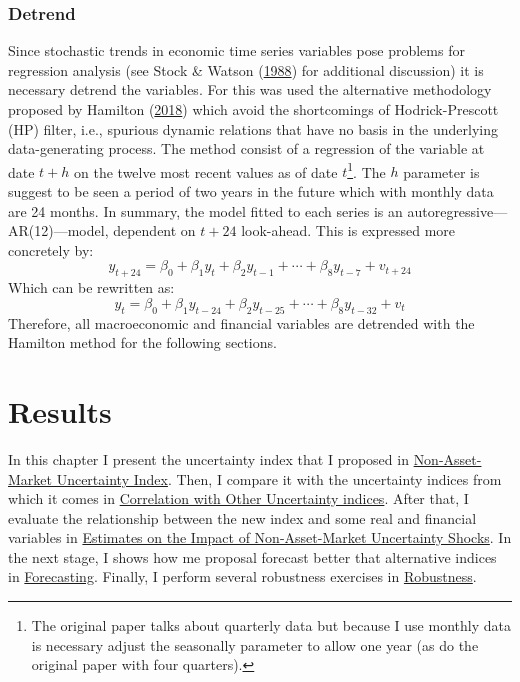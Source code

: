 \documentclass[12pt,twoside]{reedthesis}
\begin{document}
\hypertarget{detrend}{%
\subsection{Detrend}\label{detrend}}

Since stochastic trends in economic time series variables pose problems for regression analysis (see Stock \& Watson (\protect\hyperlink{ref-stocwats:1988}{1988}) for additional discussion) it is necessary detrend the variables. For this was used the alternative methodology proposed by Hamilton (\protect\hyperlink{ref-hamilton:2018}{2018}) which avoid the shortcomings of Hodrick-Prescott (HP) filter, i.e., spurious dynamic relations that have no basis in the underlying data-generating process. The method consist of a regression of the variable at date \(t + h\) on the twelve most recent values as of date \(t\)\footnote{The original paper talks about quarterly data but because I use monthly data is necessary adjust the seasonally parameter to allow one year (as do the original paper with four quarters).}. The \(h\) parameter is suggest to be seen a period of two years in the future which with monthly data are 24 months. In summary, the model fitted to each series is an autoregressive---AR(12)---model, dependent on \(t + 24\) look-ahead. This is expressed more concretely by:
\begin{equation}
  y_{t+24} = \beta_{0} + \beta_{1}y_{t} + \beta_{2}y_{t - 1} + \cdots + \beta_{8}y_{t - 7} + v_{t + 24}
  \label{eq:hamilton-basic}
\end{equation}
Which can be rewritten as:
\begin{equation}
  y_{t} = \beta_{0} + \beta_{1}y_{t - 24} + \beta_{2}y_{t - 25} + \cdots + \beta_{8}y_{t - 32} + v_{t}
  \label{eq:hamilton-final}
\end{equation}
Therefore, all macroeconomic and financial variables are detrended with the Hamilton method for the following sections.

\hypertarget{results}{%
\chapter{Results}\label{results}}

In this chapter I present the uncertainty index that I proposed in \protect\hyperlink{non-asset-market-uncertainty-index}{Non-Asset-Market Uncertainty Index}. Then, I compare it with the uncertainty indices from which it comes in \protect\hyperlink{correlation-with-uncertainty-indices}{Correlation with Other Uncertainty indices}. After that, I evaluate the relationship between the new index and some real and financial variables in \protect\hyperlink{estimates-on-the-impact-of-non-asset-market-uncertainty-shocks}{Estimates on the Impact of Non-Asset-Market Uncertainty Shocks}. In the next stage, I shows how me proposal forecast better that alternative indices in \protect\hyperlink{forecasting}{Forecasting}. Finally, I perform several robustness exercises in \protect\hyperlink{robustness}{Robustness}.
\end{document}
